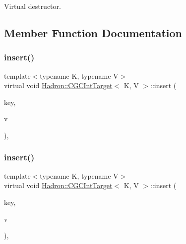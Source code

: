 Virtual destructor. 



\subsection{Member Function Documentation}
\mbox{\label{classHadron_1_1CGCIntTarget_a2c1e2eaf068abdc394ba3326c7770e77}} 
\subsubsection{\texorpdfstring{insert()}{insert()}\hspace{0.1cm}{\footnotesize\ttfamily [1/3]}}
{\footnotesize\ttfamily template$<$typename K, typename V$>$ \\
virtual void \mbox{\hyperlink{classHadron_1_1CGCIntTarget}{Hadron\+::\+C\+G\+C\+Int\+Target}}$<$ K, V $>$\+::insert (\begin{DoxyParamCaption}\item[{const \mbox{\hyperlink{structHadron_1_1CGCKeyType}{C\+G\+C\+Key\+Type}}$<$ K $>$ \&}]{key,  }\item[{const V \&}]{v }\end{DoxyParamCaption})\hspace{0.3cm}{\ttfamily [inline]}, {\ttfamily [virtual]}}

\mbox{\label{classHadron_1_1CGCIntTarget_a2c1e2eaf068abdc394ba3326c7770e77}} 
\subsubsection{\texorpdfstring{insert()}{insert()}\hspace{0.1cm}{\footnotesize\ttfamily [2/3]}}
{\footnotesize\ttfamily template$<$typename K, typename V$>$ \\
virtual void \mbox{\hyperlink{classHadron_1_1CGCIntTarget}{Hadron\+::\+C\+G\+C\+Int\+Target}}$<$ K, V $>$\+::insert (\begin{DoxyParamCaption}\item[{const \mbox{\hyperlink{structHadron_1_1CGCKeyType}{C\+G\+C\+Key\+Type}}$<$ K $>$ \&}]{key,  }\item[{const V \&}]{v }\end{DoxyParamCaption})\hspace{0.3cm}{\ttfamily [inline]}, {\ttfamily [virtual]}}

